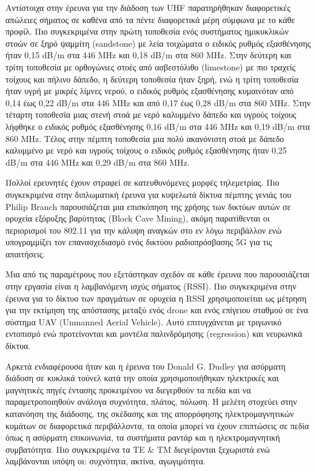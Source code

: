     Αντίστοιχα στην έρευνα για την διάδοση των UHF \cite{rak_uhf_2007} παρατηρήθηκαν
    διαφορετικές απώλειες σήματος σε καθένα από τα πέντε διαφορετικά μέρη σύμφωνα με το
    κάθε προφίλ. Πιο συγκεκριμένα στην πρώτη τοποθεσία ενός συστήματος ημικυκλικών στοών
    σε ξηρό ψαμμίτη (sandstone) με λεία τοιχώματα ο ειδικός ρυθμός εξασθένησης ήταν
    0,15 dB/m στα 446 MHz και 0,18 dB/m στα 860 MHz.
    Στην δεύτερη και τρίτη τοποθεσία με ορθογώνιες στοές από ασβεστόλιθο (limestone) με πιο
    τραχείς τοίχους και πήλινο δάπεδο, η δεύτερη τοποθεσία ήταν ξηρή, ενώ η τρίτη τοποθεσία
    ήταν υγρή με μικρές λίμνες νερού, ο ειδικός ρυθμός εξασθένησης κυμαινόταν από 0,14 έως
    0,22 dB/m στα 446 MHz και από 0,17 έως 0,28 dB/m στα 860 MHz. Στην τέταρτη τοποθεσία
    μιας στενή στοά με νερό καλυμμένο δάπεδο και υγρούς τοίχους λήφθηκε ο ειδικός ρυθμός
    εξασθένησης 0,16 dB/m στα 446 MHz και 0,19 dB/m στα 860 MHz. Τέλος στην πέμπτη τοποθεσία
    μια πολύ ακανόνιστη στοά με δάπεδο καλυμμένο με νερό και υγρούς τοίχους ο ειδικός ρυθμός
    εξασθένησης ήταν 0,25 dB/m στα 446 MHz και 0,29 dB/m στα 860 MHz.

    Πολλοί ερευνητές έχουν στραφεί σε κατευθυνόμενες μορφές τηλεμετρίας. Πιο συγκεκριμένα 
    στην διπλωματική έρευνα για κυψελωτά δίκτυα πέμπτης γενιάς του Philip Branch
    \cite{branch_fifth_2021} παρουσιάζεται μια επισκόπηση της χρήσης των δικτύων αυτών σε
    ορυχεία εξόρυξης βαρύτητας (Block Cave Mining), ακόμη παρατίθενται οι περιορισμοί του
    802.11 για την κάλυψη αναγκών στο εν λόγω περιβάλλον ενώ υπογραμμίζει τον επανασχεδιασμό
    ενός δικτύου ραδιοπρόσβασης 5G για τις απαιτήσεις.

    Μια από τις παραμέτρους που εξετάστηκαν σχεδόν σε κάθε έρευνα που παρουσιάζεται στην εργασία
    είναι η λαμβανόμενη ισχύς σήματος (RSSI). Πιο συγκεκριμένα στην έρευνα για το δίκτυο των
    πραγμάτων σε ορυχεία \cite{ming_study_2019} η RSSI χρησιμοποιείται ως μέτρηση για την 
    εκτίμηση της απόστασης μεταξύ ενός drone και ενός επίγειου σταθμού σε ένα σύστημα 
    UAV (Unmanned Aerial Vehicle). Αυτό επιτυγχάνεται με τριγωνικό εντοπισμό ενώ προτείνονται
    και μοντέλα παλινδρόμησης (regression) και νευρωνικά δίκτυα.

    Αρκετά ενδιαφέρουσα ήταν και η έρευνα του Donald G. Dudley για ασύρματη διάδοση σε κυκλικά
    τούνελ \cite{dudley_wireless_2005} κατά την οποία χρησιμοποιήθηκαν ηλεκτρικές και μαγνητικές
    πηγές έντασης προκειμένου να διεγερθούν τα πεδία και να παραμετροποιηθούν ανάλογα \cdot
    συχνότητα, πλάτος, πόλωση. Η μελέτη στοχεύει στην κατανόηση της διάδοσης, της σκέδασης και
    της απορρόφησης ηλεκτρομαγνητικών κυμάτων σε διαφορετικά περιβάλλοντα, τα οποία μπορεί να 
    έχουν επιπτώσεις σε πεδία όπως η ασύρματη επικοινωνία, τα συστήματα ραντάρ και η 
    ηλεκτρομαγνητική συμβατότητα. Πιο συγκεκριμένα τα ΤΕ \& ΤΜ διεγείρονται ξεχωριστά ενώ
    λαμβάνονται υπόψη οι: συχνότητα, ακτίνα, αγωγιμότητα.


